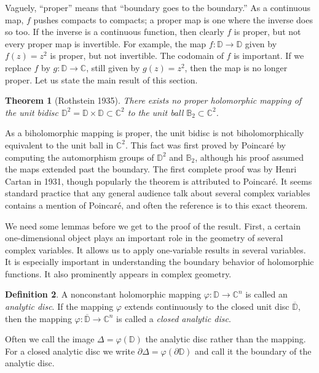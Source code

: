 \documentclass[12pt,openany]{book}
\newcommand{\C}{{\mathbb{C}}}
\newcommand{\D}{{\mathbb{D}}}
\newcommand{\bB}{{\mathbb{B}}}
\newcommand{\myindex}[1]{#1\index{#1}}
\theoremstyle{plain}
\newtheorem{thm}{Theorem}[section]
\theoremstyle{remark}
\theoremstyle{definition}
\newtheorem{defn}[thm]{Definition}
\theoremstyle{exercise}
\theoremstyle{example}
\begin{document}
Vaguely, ``proper'' means that ``boundary goes to the boundary.''
As a continuous map, $f$ pushes compacts to compacts; a proper map is
one where the inverse does so too.  If the inverse is a continuous
function, then clearly $f$ is proper,
but not every proper map is invertible.  For
example, the map $f \colon \D \to \D$ given by $f(z) = z^2$ is proper, but
not invertible.  The codomain of $f$ is important.  If we 
replace $f$ by $g \colon \D \to \C$, still given by $g(z)=z^2$,
then the map is
no longer proper.  Let us state the main result of this section.

\begin{thm}[Rothstein 1935] \label{thm:Rothstein}
There exists no proper holomorphic mapping of the unit bidisc $\D^2 = \D \times \D
\subset \C^2$ to the unit ball $\bB_2 \subset \C^2$.
\end{thm}

As a biholomorphic mapping is proper,
the unit bidisc is not biholomorphically
equivalent to the unit ball in $\C^2$.  This fact was first proved by
Poincar\'e by computing the automorphism groups of $\D^2$ and $\bB_2$,
although his proof
assumed the maps extended past the boundary.  The first
complete proof was by Henri Cartan in 1931, though popularly the theorem is
attributed to Poincar\'e.  It seems standard practice that any general audience talk
about several complex variables contains a mention of Poincar\'e,
and often the reference is to this exact theorem.

We need some lemmas before we get to the proof of the result.  First,
a certain one-dimensional object plays an important role in the geometry
of several complex variables.  It allows us to apply one-variable
results in several variables.  It is especially important in
understanding the boundary behavior of holomorphic functions.  It also
prominently appears in complex geometry.

\begin{defn}
A nonconstant holomorphic mapping
$\varphi \colon \D \to \C^n$ is called an \emph{\myindex{analytic disc}}.
If the mapping $\varphi$ extends continuously to the closed unit disc
$\overline{\D}$, then the mapping
$\varphi \colon \overline{\D} \to \C^n$ is called
a \emph{\myindex{closed analytic disc}}.

Often we call the image $\Delta = \varphi(\D)$ the analytic disc
rather than the mapping.  For a closed analytic disc we write
$\partial \Delta = \varphi( \partial \D)$ and call it the boundary
of the analytic disc.
\end{defn}
\end{document}
